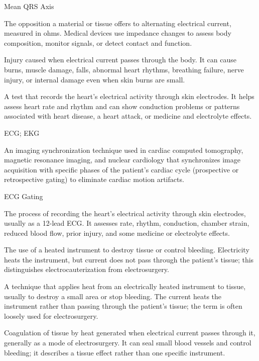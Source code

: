 \synonyms
Mean QRS Axis

 The opposition a material or tissue offers to alternating electrical current, measured in ohms. Medical devices use impedance changes to assess body composition, monitor signals, or detect contact and function.

 Injury caused when electrical current passes through the body. It can cause burns, muscle damage, falls, abnormal heart rhythms, breathing failure, nerve injury, or internal damage even when skin burns are small.

 A test that records the heart’s electrical activity through skin electrodes. It helps assess heart rate and rhythm and can show conduction problems or patterns associated with heart disease, a heart attack, or medicine and electrolyte effects.

\synonyms
ECG; EKG

 An imaging synchronization technique used in cardiac computed tomography, magnetic resonance imaging, and nuclear cardiology that synchronizes image acquisition with specific phases of the patient's cardiac cycle (prospective or retrospective gating) to eliminate cardiac motion artifacts.

\synonyms
ECG Gating

 The process of recording the heart’s electrical activity through skin electrodes, usually as a 12-lead ECG. It assesses rate, rhythm, conduction, chamber strain, reduced blood flow, prior injury, and some medicine or electrolyte effects.

 The use of a heated instrument to destroy tissue or control bleeding. Electricity heats the instrument, but current does not pass through the patient's tissue; this distinguishes electrocauterization from electrosurgery.

 A technique that applies heat from an electrically heated instrument to tissue, usually to destroy a small area or stop bleeding. The current heats the instrument rather than passing through the patient's tissue; the term is often loosely used for electrosurgery.

 Coagulation of tissue by heat generated when electrical current passes through it, generally as a mode of electrosurgery. It can seal small blood vessels and control bleeding; it describes a tissue effect rather than one specific instrument.

